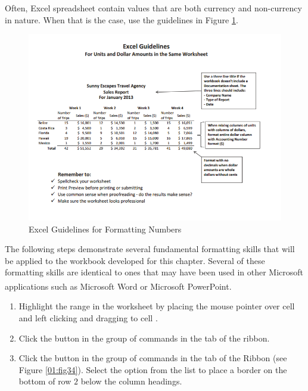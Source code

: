 Often, Excel spreadsheet contain values that are both currency and non-currency in nature. When that is the case, use the guidelines in Figure \ref{01:fig33}.

\begin{figure}[H]
	\centering
	\includegraphics[width=\maxwidth{.95\linewidth}]{gfx/ch01_fig33}
	\caption{Excel Guidelines for Formatting Numbers}
	\label{01:fig33}
\end{figure}

The following steps demonstrate several fundamental formatting skills that will be applied to the workbook developed for this chapter. Several of these formatting skills are identical to ones that may have been used in other Microsoft applications such as Microsoft\textsuperscript{\textregistered} Word\textsuperscript{\textregistered} or Microsoft\textsuperscript{\textregistered} PowerPoint\textsuperscript{\textregistered}.

\begin{enumerate}
	\item Highlight the range  in the  worksheet by placing the mouse pointer over cell  and left clicking and dragging to cell . 
	\item Click the  button in the  group of commands in the  tab of the ribbon.
	\item Click the  button in the  group of commands in the  tab of the Ribbon (see Figure \ref{01:fig34}). Select the  option from the list to place a border on the bottom of row $ 2 $ below the column headings.
\end{enumerate}


